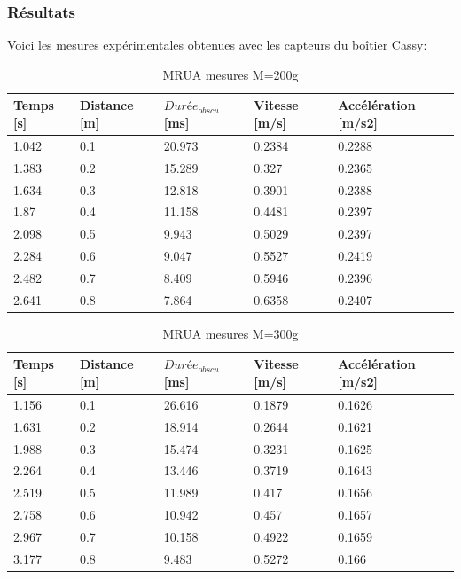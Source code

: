 \newpage
\subsubsection{Résultats}

Voici les mesures expérimentales obtenues avec les capteurs du boîtier Cassy:

\begin{table}[ht]
    \centering
    \caption[MRUA mesures M=200g]{MRUA mesures M=200g}
    \begin{tabular}{|l|l|l|l|l|}
	\hline
	Temps [s]	&Distance [m]	&$Durée_{obscu}$ [ms]	&Vitesse [m/s]	&Accélération [m/s2]\\
	\hline
	1.042	&0.1	&20.973	&0.2384	&0.2288 \\
	1.383	&0.2	&15.289	&0.327	&0.2365 \\
	1.634	&0.3	&12.818	&0.3901	&0.2388 \\
	1.87	&0.4	&11.158	&0.4481	&0.2397 \\
	2.098	&0.5	&9.943	&0.5029	&0.2397 \\
	2.284	&0.6	&9.047	&0.5527	&0.2419 \\
	2.482	&0.7	&8.409	&0.5946	&0.2396 \\
	2.641	&0.8	&7.864	&0.6358	&0.2407 \\
	\hline
    \end{tabular}
\end{table}

\begin{table}[ht]
    \centering
    \caption[MRUA mesures M=300g]{MRUA mesures M=300g}
    \begin{tabular}{|l|l|l|l|l|}
	\hline
	Temps [s]	&Distance [m]	&$Durée_{obscu}$ [ms]	&Vitesse [m/s]	&Accélération [m/s2]\\
	\hline
	1.156	&0.1	&26.616	&0.1879	&0.1626 \\
	1.631	&0.2	&18.914	&0.2644	&0.1621 \\
	1.988	&0.3	&15.474	&0.3231	&0.1625 \\
	2.264	&0.4	&13.446	&0.3719	&0.1643 \\
	2.519	&0.5	&11.989	&0.417	&0.1656 \\
	2.758	&0.6	&10.942	&0.457	&0.1657 \\
	2.967	&0.7	&10.158	&0.4922	&0.1659 \\
	3.177	&0.8	&9.483	&0.5272	&0.166  \\
	\hline
    \end{tabular}
\end{table}

